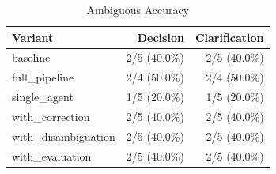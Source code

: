 \begin{table}[htbp]
\centering
\caption{Ambiguous Accuracy}
\label{tab:acc-ambig}
\begin{tabular}{l rr}
\toprule
Variant & Decision & Clarification \\
\midrule
  baseline & 2/5 (40.0\%) & 2/5 (40.0\%) \\
  full\_pipeline & 2/4 (50.0\%) & 2/4 (50.0\%) \\
  single\_agent & 1/5 (20.0\%) & 1/5 (20.0\%) \\
  with\_correction & 2/5 (40.0\%) & 2/5 (40.0\%) \\
  with\_disambiguation & 2/5 (40.0\%) & 2/5 (40.0\%) \\
  with\_evaluation & 2/5 (40.0\%) & 2/5 (40.0\%) \\
\bottomrule
\end{tabular}
\end{table}

